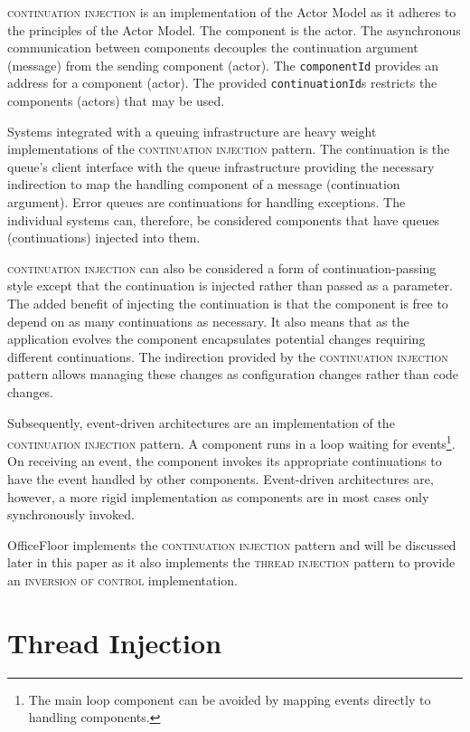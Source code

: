 \documentclass[prodmode]{style/acmlarge}
\begin{document}
\textsc{continuation injection} is an implementation of the Actor Model
\cite{actors} as it adheres to the principles of the Actor Model.  The component
is the actor.  The asynchronous communication between components decouples the continuation
argument (message) from the sending component (actor).  The \texttt{componentId}
provides an address for a component (actor).  The provided
\texttt{continuationId}s restricts the components (actors) that may be used.

Systems integrated with a queuing infrastructure are heavy weight
implementations of the \textsc{continuation injection} pattern.  The
continuation is the queue's client interface with the queue infrastructure
providing the necessary indirection to map the handling component of a message
(continuation argument).  Error queues are continuations for handling
exceptions.  The individual systems can, therefore, be considered components
that have queues (continuations) injected into them.

\textsc{continuation injection} can also be considered a form of
continuation-passing style \cite{continuations} except that the continuation is
injected rather than passed as a parameter.  The added benefit of injecting the
continuation is that the component is free to depend on as many continuations as
necessary.  It also means that as the application evolves the component
encapsulates potential changes requiring different continuations.  The
indirection provided by the \textsc{continuation injection} pattern allows
managing these changes as configuration changes rather than code changes.

Subsequently, event-driven architectures are an implementation of the
\textsc{continuation injection} pattern.  A component runs in a loop waiting for
events\footnote{The main loop component can be avoided by mapping events
directly to handling components.}.  On receiving an event, the component invokes
its appropriate continuations to have the event handled by other components.
Event-driven architectures are, however, a more rigid implementation as
components are in most cases only synchronously invoked.

OfficeFloor \cite{officefloor} implements the \textsc{continuation injection}
pattern and will be discussed later in this paper as it also implements the
\textsc{thread injection} pattern to provide an \textsc{inversion of control}
implementation.



\section{Thread Injection}
\end{document}
